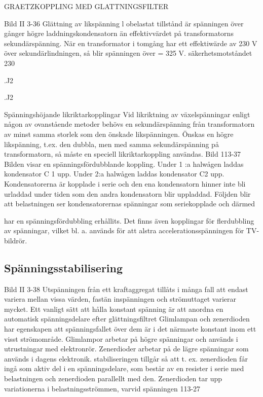 GRAETZKOPPLING MED GLATTNINGSFILTER

Bild II 3-36 Glättning av likspänning
l obelastat tillstånd är spänningen över
gånger högre
laddningskondensatorn
än effektivvärdet på transformatorns sekundärspänning. När en transformator i tomgång har ett effektiwärde av 230 V över
sekundärlindningen, så blir spänningen över
= 325 V.
säkerhetsmotståndet 230

.J2

.J2

Spänningshöjande likriktarkopplingar
Vid likriktning av växelspänningar enligt någon av ovanstående metoder behövs en
sekundärspänning från transformatorn av
minst samma storlek som den önskade likspänningen. Önskas en högre likspänning,
t.ex. den dubbla, men med samma sekundärspänning på transformatorn, så måste en
speciell likriktarkoppling användas.
Bild 113-37
Bilden visar en spänningsfördubblande
koppling. Under 1 :a halwågen laddas kondensator C 1 upp. Under 2:a halwågen laddas kondensator C2 upp. Kondensatorerna
är kopplade i serie och den ena kondensatorn
hinner inte bli urladdad under tiden som den
andra kondensatorn blir uppladdad. Följden
blir att belastningen ser kondensatorernas
spänningar som seriekopplade och därmed

har en spänningsfördubbling erhållits. Det
finns även kopplingar för flerdubbling av
spänningar, vilket bl. a. används för att alstra
accelerationsspänningen för TV-bildrör.

\subsection{Spänningsstabilisering}

Bild II 3-38
Utspänningen från ett kraftaggregat tillåts i
många fall att endast variera mellan vissa
värden, fastän inspänningen och strömuttaget varierar mycket. Ett vanligt sätt att hålla
konstant spänning är att anordna en automatisk spänningsdelare efter glättningsfiltret
Glimlampan och zenerdioden har egenskapen att spänningsfallet över dem är i det
närmaste konstant inom ett visst strömområde. Glimlampor arbetar på högre spänningar och används i utrustningar med elektronrör. Zenerdioder arbetar på de lägre
spänningar som används i dagens elektronik.
stabiliseringen tillgår så att t. ex. zenerdioden får ingå som aktiv del i en spänningsdelare, som består av en resister i serie med
belastningen och zenerdioden parallellt med
den. Zenerdioden tar upp variationerna i
belastningsströmmen, varvid spänningen
113-27


